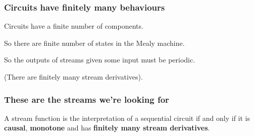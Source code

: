 \begin{frame}
    \frametitle{Circuits have finitely many behaviours}

    Circuits have a finite number of components.

    \pause

    So there are finite number of states in the Mealy machine.

    \pause

    So the outputs of streams given some input must be \alert{periodic}.

    \pause

    (There are finitely many \alert{stream derivatives}).
\end{frame}
\begin{frame}
    \frametitle{These are the streams we're looking for}

    \begin{theorem}
        A stream function is the interpretation of a sequential circuit
        if and only if it is \textbf{causal}, \textbf{monotone} and has
        \textbf{finitely many stream derivatives}.
    \end{theorem}
\end{frame}
